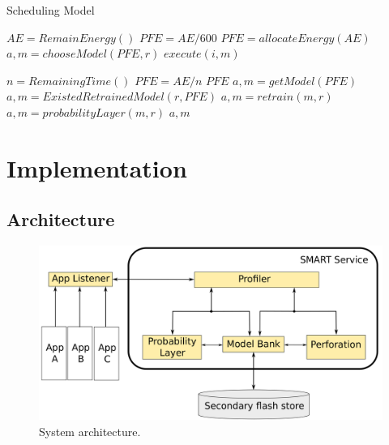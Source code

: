 \documentclass[pageno]{jpaper}
\begin{document}
\begin{algorithm}
 \caption{Scheduling Model}
  \begin{algorithmic}[1]
        \State $AE = RemainEnergy()$    
            \State $PFE = AE / 600 $ 
                \State $PFE = allocateEnergy(AE)$
        \EndIf
            \State $a, m = chooseModel(PFE, r)$  
            \State $execute(i,m)$        
    \EndFunction

        \State $n = RemainingTime()$
        \State $PFE = AE/n$
        \State \Return $PFE$
    \EndFunction
            \State $a, m = getModel(PFE)$ 
            \State $a,m = ExistedRetrainedModel(r, PFE)$
                    \State $a,m = retrain(m,r)$
                \Else
                    \State $a,m = probabilityLayer(m,r)$
                \EndIf
            \EndIf
        \EndIf
        \State \Return $a,m$
    \EndFunction

    
\end{algorithmic}
\end{algorithm}




\section{Implementation} \label{implementation}
\subsection{Architecture}

\begin{figure} 
\includegraphics[scale=0.095]{architecture.png}
\caption{System architecture.}
\label{fig:Architecture}
\end{figure}
\end{document}
